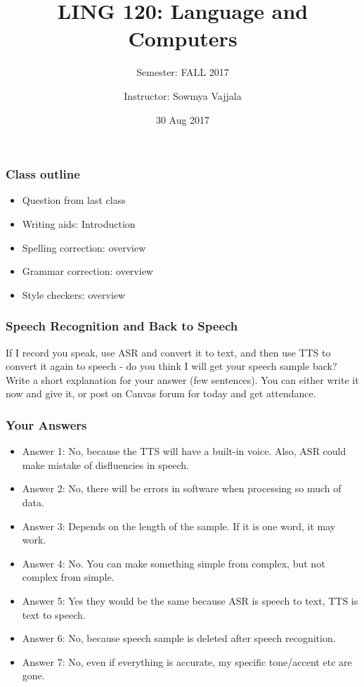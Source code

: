 \documentclass{beamer}
\author[Sowmya Vajjala]{Instructor: Sowmya Vajjala}
\title[LING 120]{LING 120: Language and Computers}
\subtitle{Semester: FALL 2017}
\date{30 Aug 2017}
\institute{Iowa State University, USA}
\begin{document}
\begin{frame}\titlepage
\end{frame}

\begin{frame}
\frametitle{Class outline}
\begin{itemize}
\item Question from last class %
\item Writing aids: Introduction 
\item Spelling correction: overview %
\item Grammar correction: overview %
\item Style checkers: overview %
\end{itemize}
\end{frame}

\begin{frame}
\frametitle{Speech Recognition and Back to Speech}
If I record you speak, use ASR and convert it to text, and then use TTS to convert it again to speech - do you think I will get your speech sample back? Write a short explanation for your answer (few sentences). You can either write it now and give it, or post on Canvas forum for today and get attendance.
\end{frame}

\begin{frame}
\frametitle{Your Answers}
\begin{itemize}
\item Answer 1: No, because the TTS will have a built-in voice. Also, ASR could make mistake of disfluencies in speech.
\item Answer 2: No, there will be errors in software when processing so much of data.
\item Answer 3: Depends on the length of the sample. If it is one word, it may work.
\item Answer 4: No. You can make something simple from complex, but not complex from simple. 
\item Answer 5: Yes they would be the same because ASR is speech to text, TTS is text to speech. 
\item Answer 6: No, because speech sample is deleted after speech recognition. 
\item Answer 7: No, even if everything is accurate, my specific tone/accent etc are gone. 
\end{itemize}
\end{frame}
\end{document}
